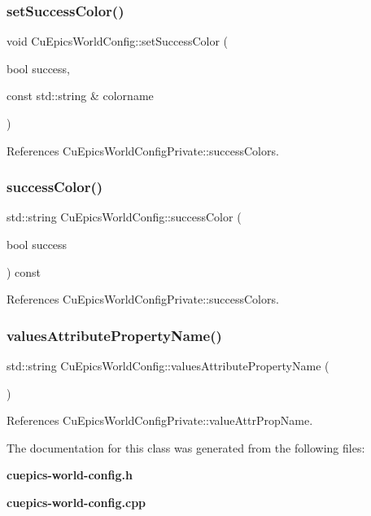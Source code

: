 \subsubsection{set\+Success\+Color()}
{\footnotesize\ttfamily void Cu\+Epics\+World\+Config\+::set\+Success\+Color (\begin{DoxyParamCaption}\item[{bool}]{success,  }\item[{const std\+::string \&}]{colorname }\end{DoxyParamCaption})}



References Cu\+Epics\+World\+Config\+Private\+::success\+Colors.

\mbox{\label{classCuEpicsWorldConfig_a510fee27abe8142522b347a54e270577}} 
\subsubsection{success\+Color()}
{\footnotesize\ttfamily std\+::string Cu\+Epics\+World\+Config\+::success\+Color (\begin{DoxyParamCaption}\item[{bool}]{success }\end{DoxyParamCaption}) const}



References Cu\+Epics\+World\+Config\+Private\+::success\+Colors.

\mbox{\label{classCuEpicsWorldConfig_a3ff739254a3d7ca6c24e931aa3ef80b5}} 
\subsubsection{values\+Attribute\+Property\+Name()}
{\footnotesize\ttfamily std\+::string Cu\+Epics\+World\+Config\+::values\+Attribute\+Property\+Name (\begin{DoxyParamCaption}{ }\end{DoxyParamCaption})}



References Cu\+Epics\+World\+Config\+Private\+::value\+Attr\+Prop\+Name.



The documentation for this class was generated from the following files\+:\begin{DoxyCompactItemize}
\item 
\textbf{ cuepics-\/world-\/config.\+h}\item 
\textbf{ cuepics-\/world-\/config.\+cpp}\end{DoxyCompactItemize}
